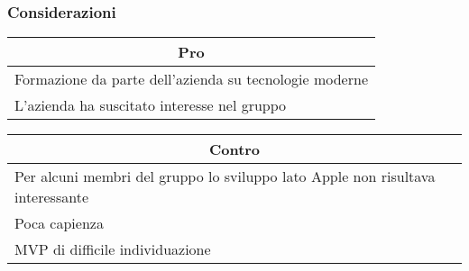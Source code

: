 \subsubsection{Considerazioni}
\begin{minipage}[t]{0.45\linewidth}
    \vspace{0pt}
    {\renewcommand{\arraystretch}{1.5}
    \begin{tabular}{p{1\linewidth}}
        \multicolumn{1}{c}{\textbf{Pro}} \\
        \midrule
        Formazione da parte dell'azienda su tecnologie moderne \\
        L'azienda ha suscitato interesse nel gruppo \\
        \hline
    \end{tabular}
    }
\end{minipage}
\hspace{0.05\linewidth}
\begin{minipage}[t]{0.45\linewidth}
    \vspace{0pt}
    {\renewcommand{\arraystretch}{1.5}
    \begin{tabular}{p{1\linewidth}}
        \multicolumn{1}{c}{\textbf{Contro}} \\
        \midrule
        Per alcuni membri del gruppo lo sviluppo lato Apple non risultava interessante \\
        Poca capienza \\
        MVP di difficile individuazione \\
        \hline
    \end{tabular}
    }
\end{minipage}
\vspace{1em}

